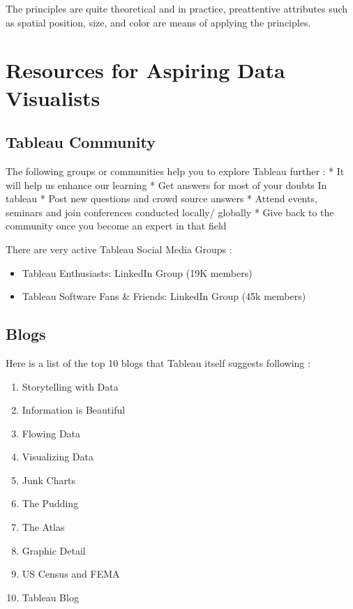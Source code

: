 \documentclass[]{book}
\providecommand{\tightlist}{%
  \setlength{\itemsep}{0pt}\setlength{\parskip}{0pt}}
\theoremstyle{definition}
\theoremstyle{definition}
\theoremstyle{definition}
\theoremstyle{remark}
\begin{document}
The principles are quite theoretical and in practice, preattentive
attributes such as spatial position, size, and color are means of
applying the principles.

\section{Resources for Aspiring Data
Visualists}\label{resources-for-aspiring-data-visualists}

\subsection{Tableau Community}\label{tableau-community}

The following groups or communities help you to explore Tableau further
\citep{Tableau_Community}: * It will help us enhance our learning * Get
answers for most of your doubts In tableau * Post new questions and
crowd source answers * Attend events, seminars and join conferences
conducted locally/ globally * Give back to the community once you become
an expert in that field

There are very active Tableau Social Media Groups
\citep{LinkedIn_Groups}:

\begin{itemize}
\tightlist
\item
  Tableau Enthusiasts: LinkedIn Group (19K members)
\item
  Tableau Software Fans \& Friends: LinkedIn Group (45k members)
\end{itemize}

\subsection{Blogs}\label{blogs}

Here is a list of the top 10 blogs that Tableau itself suggests
following \citep{Top_10_Blogs}:

\begin{enumerate}
\def\labelenumi{\arabic{enumi}.}
\tightlist
\item
  Storytelling with Data
\item
  Information is Beautiful
\item
  Flowing Data
\item
  Visualizing Data
\item
  Junk Charts
\item
  The Pudding
\item
  The Atlas
\item
  Graphic Detail
\item
  US Census and FEMA
\item
  Tableau Blog
\end{enumerate}
\end{document}
